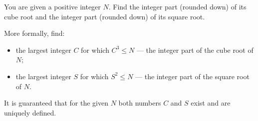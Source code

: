 You are given a positive integer $N$. Find the integer part (rounded down) of its cube root and the integer part (rounded down) of its square root.

More formally, find:

\begin{itemize}
\item the largest integer $C$ for which $C^3 \le N$ --- the integer part of the cube root of $N$;
\item the largest integer $S$ for which $S^2 \le N$ --- the integer part of the square root of $N$.
\end{itemize}

It is guaranteed that for the given $N$ both numbers $C$ and $S$ exist and are uniquely defined.
